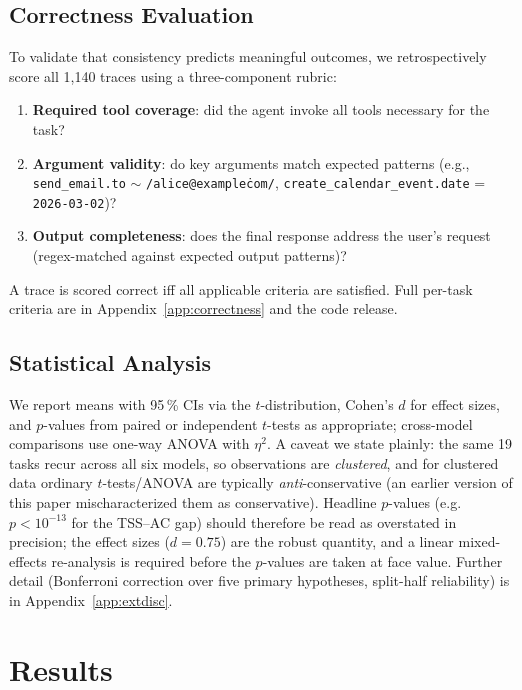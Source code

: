 \documentclass[11pt]{article}
\begin{document}
\subsection{Correctness Evaluation}
\label{sec:correctness_method}

To validate that consistency predicts meaningful outcomes, we retrospectively score
all 1,140 traces using a three-component rubric:
\begin{enumerate}[leftmargin=1.5em]
  \item \textbf{Required tool coverage}: did the agent invoke all tools necessary
    for the task?
  \item \textbf{Argument validity}: do key arguments match expected patterns
    (e.g., \texttt{send\_email.to} $\sim$ \texttt{/alice@example\.com/},
    \texttt{create\_calendar\_event.date} = \texttt{2026-03-02})?
  \item \textbf{Output completeness}: does the final response address the user's
    request (regex-matched against expected output patterns)?
\end{enumerate}
A trace is scored correct iff all applicable criteria are satisfied. Full per-task
criteria are in Appendix~\ref{app:correctness} and the code release.

\subsection{Statistical Analysis}
\label{sec:stats}

We report means with 95\,\% CIs via the $t$-distribution, Cohen's $d$ for effect
sizes, and $p$-values from paired or independent $t$-tests as appropriate;
cross-model comparisons use one-way ANOVA with $\eta^2$. A caveat we state
plainly: the same 19 tasks recur across all six models, so observations are
\emph{clustered}, and for clustered data ordinary $t$-tests/ANOVA are typically
\emph{anti}-conservative (an earlier version of this paper mischaracterized
them as conservative). Headline $p$-values (e.g.\ $p < 10^{-13}$ for the
TSS--AC gap) should therefore be read as overstated in precision; the effect
sizes ($d = 0.75$) are the robust quantity, and a linear mixed-effects
re-analysis is required before the $p$-values are taken at face value. Further
detail (Bonferroni correction over five primary hypotheses, split-half
reliability) is in Appendix~\ref{app:extdisc}.

\section{Results}
\end{document}
